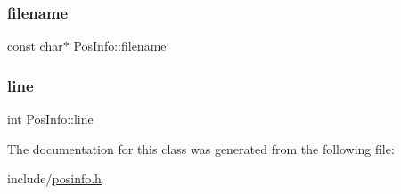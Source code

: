 \subsubsection{\texorpdfstring{filename}{filename}}
{\footnotesize\ttfamily const char$\ast$ Pos\+Info\+::filename}

\mbox{\label{classPosInfo_a1fbd2d0d0f4d2a20ade06f08e992da2c}} 
\subsubsection{\texorpdfstring{line}{line}}
{\footnotesize\ttfamily int Pos\+Info\+::line}



The documentation for this class was generated from the following file\+:\begin{DoxyCompactItemize}
\item 
include/\hyperlink{posinfo_8h}{posinfo.\+h}\end{DoxyCompactItemize}
